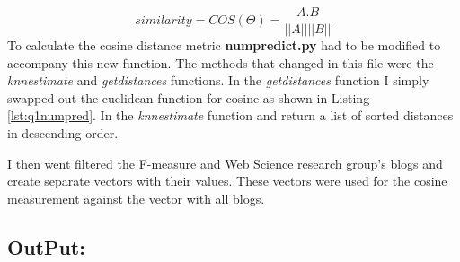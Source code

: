 \documentclass[letterpaper,11pt]{article}
\begin{document}
\[similarity 
	=COS(\Theta )
	= \dfrac{A . B}{|| A || || B ||}
  	
\]
To calculate the cosine distance metric \textbf{numpredict.py} had to be modified to accompany this new function. The methods that changed in this file were the \textit{knnestimate} and \textit{getdistances} functions. In the \textit{getdistances} function I simply swapped out the euclidean function for cosine as shown in Listing \ref{lst:q1numpred}. In the \textit{knnestimate} function and return a list of sorted distances in descending order.

I then went filtered the F-measure and Web Science research group's blogs and create separate vectors with their values. These vectors were used for the cosine measurement against the vector with all blogs. 




\subsection*{OutPut:}



\clearpage



\end{document}
